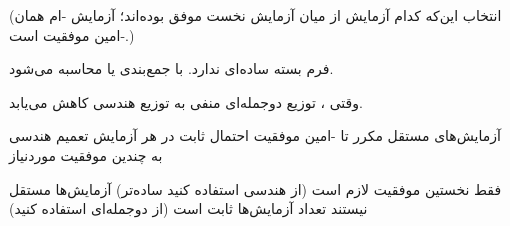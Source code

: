 

(انتخاب این‌که کدام  آزمایش از میان  آزمایش نخست موفق بوده‌اند؛ آزمایش -ام همان -امین موفقیت است.)


فرم بسته ساده‌ای ندارد. با جمع‌بندی یا  محاسبه می‌شود.






وقتی ، توزیع دوجمله‌ای منفی به توزیع هندسی کاهش می‌یابد.


\lr{\mbox{\PSyes{}}} آزمایش‌های مستقل مکرر تا -امین موفقیت\PSbr{}\lr{\mbox{\PSyes{}}} احتمال ثابت در هر آزمایش\PSbr{}\lr{\mbox{\PSyes{}}} تعمیم هندسی به چندین موفقیت موردنیاز


\lr{\mbox{\PSno{}}} فقط نخستین موفقیت لازم است (از هندسی استفاده کنید  ساده‌تر)\PSbr{}\lr{\mbox{\PSno{}}} آزمایش‌ها مستقل نیستند\PSbr{}\lr{\mbox{\PSno{}}} تعداد آزمایش‌ها ثابت است (از دوجمله‌ای استفاده کنید)



